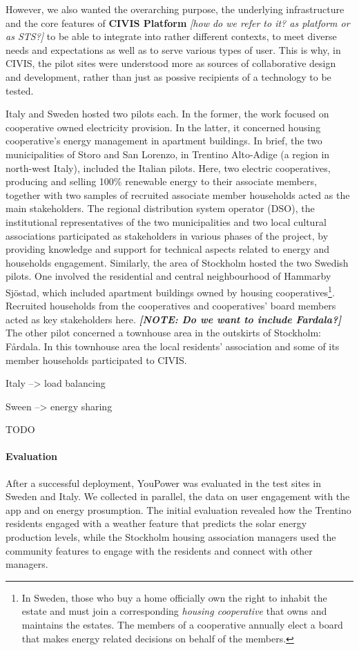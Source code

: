 However, we also wanted the overarching purpose, the underlying infrastructure and the core features of 
\textbf{CIVIS Platform} \textit{[how do we refer to it? as platform or as STS?]} to be able to integrate 
into rather different contexts, to meet diverse needs and expectations as well as to serve various 
types of user. This is why, in CIVIS, the pilot sites were understood more as sources of collaborative design and development,
rather than just as possive recipients of a technology to be tested.  

Italy and Sweden hosted two pilots each. In the former, the work focused on cooperative owned 
electricity provision. In the latter, it concerned housing cooperative's energy management in 
apartment buildings. 
In brief, the two municipalities of Storo and San Lorenzo, in Trentino Alto-Adige (a region in 
north-west Italy), included the Italian pilots. Here, two electric cooperatives, producing and 
selling 100\% renewable energy to their associate members, together with two samples of recruited 
associate member households acted as the main stakeholders. The regional distribution system 
operator (DSO), the institutional representatives of the two municipalities and two local cultural 
associations participated as stakeholders in various phases of the project, by providing knowledge 
and support for technical aspects related to energy and households engagement.
Similarly, the area of Stockholm hosted the two Swedish pilots. One involved the residential and 
central neighbourhood of Hammarby Sj\"{o}stad, which included apartment buildings owned by housing 
cooperatives\footnote{In Sweden, those who buy a home officially own the right to inhabit the estate 
and must join a corresponding \textit{housing cooperative} that owns and maintains the estates. The 
members of a cooperative annually elect a board that makes energy related decisions on behalf of 
the members.}. Recruited households from the cooperatives and cooperatives' board members acted
as key stakeholders here. \textbf{\textit{[NOTE: Do we want to include Fardala?]}} The other pilot 
concerned a townhouse area in the outskirts of Stockholm: F\aa{}rdala. In this townhouse area the 
local residents’ association and some of its member households participated to CIVIS.

Italy --> load balancing

Sween --> energy sharing

TODO

\paragraph{Evaluation} After a successful deployment, YouPower was evaluated in the test sites in Sweden and Italy. We collected in parallel, the data on user engagement with the app and on energy prosumption. The initial evaluation revealed how the Trentino residents engaged with a weather feature that predicts the solar energy production levels, while the Stockholm housing association managers used the community features to engage with the residents and connect with other managers. 

